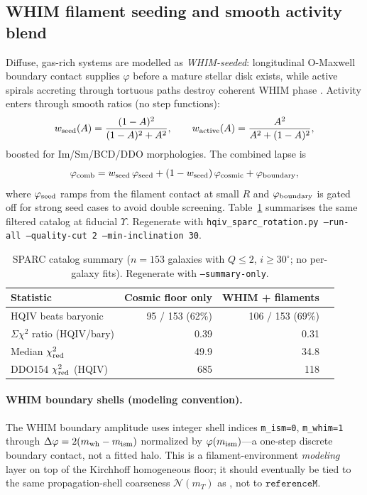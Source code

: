 \documentclass[11pt]{amsart}
\begin{document}
\subsection{WHIM filament seeding and smooth activity blend}
Diffuse, gas-rich systems are modelled as \emph{WHIM-seeded}: longitudinal O-Maxwell
boundary contact supplies $\varphi$ before a mature stellar disk exists, while active
spirals accreting through tortuous paths destroy coherent WHIM phase
\cite{ettinger2026longitudinal,hqiv-coronal-paper}. Activity enters through smooth
ratios (no step functions):
\[
w_{\rm seed}(A)=\frac{(1-A)^2}{(1-A)^2+A^2},\qquad
w_{\rm active}(A)=\frac{A^2}{A^2+(1-A)^2},
\]
boosted for Im/Sm/BCD/DDO morphologies. The combined lapse is
\[
\varphi_{\rm comb}=w_{\rm seed}\,\varphi_{\rm seed}+(1-w_{\rm seed})\,\varphi_{\rm cosmic}+\varphi_{\rm boundary},
\]
where $\varphi_{\rm seed}$ ramps from the filament contact at small $R$ and
$\varphi_{\rm boundary}$ is gated off for strong seed cases to avoid double screening.
Table~\ref{tab:sparc-whim} summarises the same filtered catalog at fiducial $\Upsilon$.
Regenerate with \texttt{hqiv\_sparc\_rotation.py --run-all --quality-cut 2
--min-inclination 30}.

\begin{table}[t]
\centering
\caption{SPARC catalog summary ($n=153$ galaxies with $Q\le 2$, $i\ge 30^\circ$; no
per-galaxy fits). Regenerate with \texttt{--summary-only}.}
\label{tab:sparc-whim}
\small
\begin{tabular}{@{}lrrr@{}}
\toprule
Statistic & Cosmic floor only & WHIM + filaments \\
\midrule
HQIV beats baryonic & 95 / 153 (62\%) & 106 / 153 (69\%) \\
$\Sigma\chi^2$ ratio (HQIV/bary) & 0.39 & 0.31 \\
Median $\chi^2_{\rm red}$ & 49.9 & 34.8 \\
DDO154 $\chi^2_{\rm red}$ (HQIV) & 685 & 118 \\
\bottomrule
\end{tabular}
\end{table}

\paragraph{WHIM boundary shells (modeling convention).}
The WHIM boundary amplitude uses integer shell indices \texttt{m\_ism=0},
\texttt{m\_whim=1} through $\Delta\varphi=2(m_{\rm wh}-m_{\rm ism})$ normalized by
$\varphi(m_{\rm ism})$---a one-step discrete boundary contact, not a fitted halo.
This is a filament-environment \emph{modeling} layer on top of the Kirchhoff homogeneous
floor; it should eventually be tied to the same propagation-shell coarseness
$\mathcal{N}(m_T)$ as \cite{hqiv-kirchhoff-paper}, not to $\texttt{referenceM}$.
\end{document}
